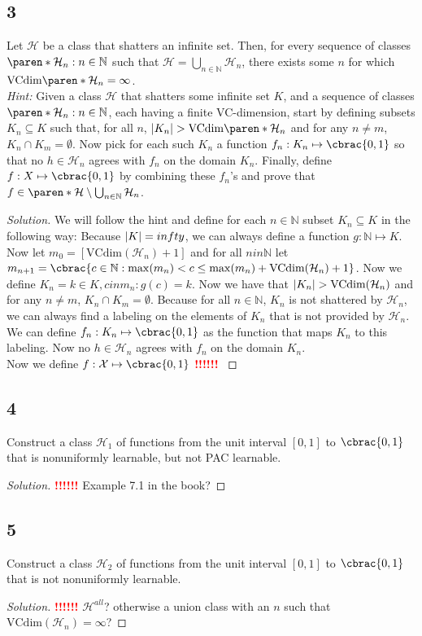 \documentclass[10pt, a4paper, twoside]{amsart}
\theoremstyle{plain}
\newcommand{\N}{\ensuremath{\mathbb{N}}}
\DeclarePairedDelimiter\abs{\lvert}{\rvert}
\DeclarePairedDelimiter\cbrac\{\}
\DeclarePairedDelimiter\paren()
\newcommand{\cH}{\ensuremath{\mathcal{H}}}
\newcommand{\cX}{\ensuremath{\mathcal{X}}}
\newenvironment{solution}
               {\let\oldqedsymbol=\qedsymbol
                \renewcommand{\qedsymbol}{$\blacktriangleleft$}
                \begin{proof}[Solution]}
               {\end{proof}
                \renewcommand{\qedsymbol}{\oldqedsymbol}}
\newcommand{\TODO}{\textcolor{red}{\textbf{!!!!!! }}}
\begin{document}
\subsection*{3}
Let $\cH$ be a class that shatters an infinite set. Then, for every sequence of classes $\paren*{\cH_n : n \in \N}$ such that $\cH = \bigcup_{n \in \N} \cH_n$, there exists some $n$ for which $\text{VCdim} \paren*{\cH_n} = \infty$.\\
\textit{Hint:} Given a class $\cH$ that shatters some infinite set $K$, and a sequence of classes $\paren*{\cH_n : n \in \N}$, each having a finite VC-dimension, start by defining subsets $K_n \subseteq K$ such that, for all $n$, $\abs*{K_n} > \text{VCdim} \paren*{\cH_n}$ and for any $n \neq m$, $K_n \cap K_m = \emptyset$. Now pick for each such $K_n$ a function $f_n : K_n \mapsto \cbrac{0,1}$ so that no $h \in \cH_n$ agrees with $f_n$ on the domain $K_n$. Finally, define $f : X \mapsto \cbrac{0,1}$ by combining these $f_n$'s and prove that $f \in \paren*{\cH \setminus \bigcup_{n \in \N} \cH_n}$.
\begin{solution}
We will follow the hint and define for each $n \in \N$ subset $K_n \subseteq K$ in the following way: Because $\abs*{K} = infty$, we can always define a function $g : \N \mapsto K$. Now let $m_0 = [\text{VCdim}(\cH_n)+1]$ and for all $n in \N$ let $m_{n+1} = \cbrac{c \in \N: \max(m_n)< c \leq \max(m_n)+\text{VCdim}(\cH_n)+1}$. Now we define $K_n = {k \in K, c in m_n: g(c) = k}$. Now we have that $\abs*{K_n} > \text{VCdim}(\cH_n)$ and for any $n \neq m$, $K_n \cap K_m = \emptyset$. Because for all $n \in \N$, $K_n$ is not shattered by $\cH_n$, we can always find a labeling on the elements of $K_n$ that is not provided by $\cH_n$. We can define $f_n : K_n \mapsto \cbrac{0,1}$ as the function that maps $K_n$ to this labeling. Now no $h \in \cH_n$ agrees with $f_n$ on the domain $K_n$. \\
Now we define $f:\cX \mapsto \cbrac{0,1}$ 
\TODO
\end{solution}
\subsection*{4}
Construct a class $\cH_1$ of functions from the unit interval $[0,1]$ to $\cbrac{0,1}$ that is nonuniformly learnable, but not PAC learnable.
\begin{solution}
\TODO Example 7.1 in the book?
\end{solution}
\subsection*{5}
Construct a class $\cH_2$ of functions from the unit interval $[0,1]$ to $\cbrac{0,1}$ that is not nonuniformly learnable.
\begin{solution}
\TODO $\cH^{all}$? otherwise a union class with an $n$ such that $\text{VCdim}(\cH_n) = \infty$?
\end{solution}
\end{document}
